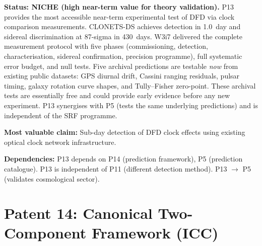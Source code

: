 \documentclass[11pt]{article}
\begin{document}
\begin{tcolorbox}[colback=yellow!5!white, colframe=yellow!60!black,
  title=\textbf{P13: NICHE --- Resource Allocation: 3/5}]
\textbf{Status: NICHE (high near-term value for theory validation).}
P13 provides the most accessible near-term experimental test of DFD
via clock comparison measurements. CLONETS-DS achieves detection in
1.0~day and sidereal discrimination at 87-sigma in 430~days. W3i7
delivered the complete measurement protocol with five phases
(commissioning, detection, characterisation, sidereal confirmation,
precision programme), full systematic error budget, and null tests.
Five archival predictions are testable \emph{now} from existing
public datasets: GPS diurnal drift, Cassini ranging residuals,
pulsar timing, galaxy rotation curve shapes, and Tully--Fisher
zero-point. These archival tests are essentially free and could
provide early evidence before any new experiment. P13 synergises
with P5 (tests the same underlying predictions) and is independent
of the SRF programme.

\textbf{Most valuable claim:} Sub-day detection of DFD clock effects
using existing optical clock network infrastructure.

\textbf{Dependencies:} P13 depends on P14 (prediction framework), P5
(prediction catalogue). P13 is independent of P11 (different detection
method). P13 $\to$ P5 (validates cosmological sector).
\end{tcolorbox}

\section{Patent 14: Canonical Two-Component Framework (ICC)}
\label{sec:P14}
\end{document}
